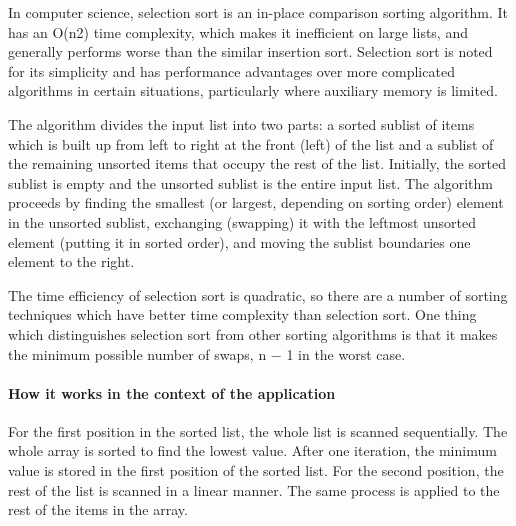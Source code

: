 In computer science, selection sort is an in-place comparison sorting algorithm. It has an O(n2) time complexity, which makes it inefficient on large lists, and generally performs worse than the similar insertion sort. Selection sort is noted for its simplicity and has performance advantages over more complicated algorithms in certain situations, particularly where auxiliary memory is limited.
\par
\bigskip
The algorithm divides the input list into two parts: a sorted sublist of items which is built up from left to right at the front (left) of the list and a sublist of the remaining unsorted items that occupy the rest of the list. Initially, the sorted sublist is empty and the unsorted sublist is the entire input list. The algorithm proceeds by finding the smallest (or largest, depending on sorting order) element in the unsorted sublist, exchanging (swapping) it with the leftmost unsorted element (putting it in sorted order), and moving the sublist boundaries one element to the right.
\par
\bigskip
The time efficiency of selection sort is quadratic, so there are a number of sorting techniques which have better time complexity than selection sort. One thing which distinguishes selection sort from other sorting algorithms is that it makes the minimum possible number of swaps, n − 1 in the worst case.

\paragraph{How it works in the context of the application}
For the first position in the sorted list, the whole list is scanned sequentially. The whole array is sorted to find the lowest value. After one iteration, the minimum value is stored in the first position of the sorted list. For the second position, the rest of the list is scanned in a linear manner. The same process is applied to the rest of the items in the array.

